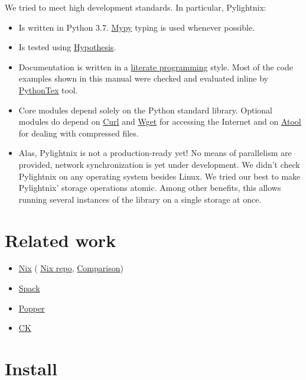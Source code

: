 \documentclass{article}
\begin{document}
We tried to meet high development standards. In particular, Pylightnix:
\begin{itemize}
  \item Is written in Python 3.7. \href{http://mypy-lang.org/}{Mypy} typing is
    used whenever possible.
  \item Is tested using \href{https://pypi.org/project/hypothesis/}{Hypothesis}.
  \item Documentation is written in a
    \href{https://en.wikipedia.org/wiki/Literate_programming}{literate
    programming} style. Most of the code examples shown in this manual were
    checked and evaluated inline by
    \href{https://github.com/gpoore/pythontex}{PythonTex} tool.
  \item Core modules depend solely on the Python standard library. Optional
    modules do depend on \href{https://curl.se/}{Curl} and
    \href{https://www.gnu.org/software/wget/}{Wget} for accessing the Internet
    and on \href{https://www.nongnu.org/atool/}{Atool} for dealing with
    compressed files.
  \item Alas, Pylightnix is not a production-ready yet! No means of parallelism
    are provided, network synchronization is yet under development.  We didn't
    check Pylightnix on any operating system besides Linux. We tried our best
    to make Pylightnix' storage operations atomic. Among other benefits,
    this allows running several instances of the library on a single
    storage at once.
\end{itemize}

\section{Related work}

\begin{itemize}
  \item \href{https://nixos.org}{Nix} (
    \href{https://github.com/nixos/nix}{Nix repo},
    \href{./Comparison.md#Pylightnix-vs-Nix}{Comparison})
  \item \href{https://spack.io}{Spack}
  \item \href{https://falsifiable.us}{Popper}
  \item \href{https://cknowledge.org}{CK}
\end{itemize}

\section{Install}
\end{document}
